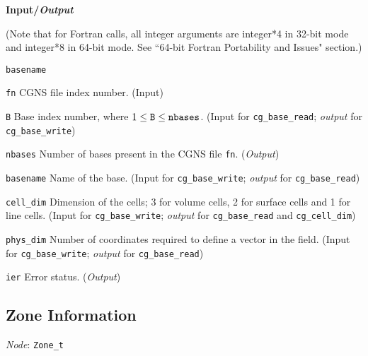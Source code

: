 \noindent
\textbf{\textcolor{input}{Input}/\textcolor{output}{\textit{Output}}}

\noindent (Note that for Fortran calls, all integer arguments are integer*4 in 32-bit mode and integer*8 in 64-bit mode.
See ``64-bit Fortran Portability and Issues" section.)

\begin{Ventryi}{\texttt{basename}}\raggedright
\item [\texttt{fn}]
      CGNS file index number.
      (\textcolor{input}{Input})
\item [\texttt{B}]
      Base index number, where $1 \leq \text{\texttt{B}} \leq \text{\texttt{nbases}}$.
      (\textcolor{input}{Input} for \texttt{cg\_base\_read};
      \textcolor{output}{\textit{output}} for \texttt{cg\_base\_write})
\item [\texttt{nbases}]
      Number of bases present in the CGNS file \texttt{fn}.
      (\textcolor{output}{\textit{Output}})
\item [\texttt{basename}]
      Name of the base.
      (\textcolor{input}{Input} for \texttt{cg\_base\_write};
      \textcolor{output}{\textit{output}} for \texttt{cg\_base\_read})
\item [\texttt{cell\_dim}]
      Dimension of the cells; 3 for volume cells, 2 for surface cells
      and 1 for line cells.
      (\textcolor{input}{Input} for \texttt{cg\_base\_write};
      \textcolor{output}{\textit{output}} for \texttt{cg\_base\_read}
      and \texttt{cg\_cell\_dim})
\item [\texttt{phys\_dim}]
      Number of coordinates required to define a vector in the field.
      (\textcolor{input}{Input} for \texttt{cg\_base\_write};
      \textcolor{output}{\textit{output}} for \texttt{cg\_base\_read})
\item [\texttt{ier}]
      Error status.
      (\textcolor{output}{\textit{Output}})
\end{Ventryi}

\newpage
\subsection{Zone Information}
\label{s:zone}

\noindent
\textit{Node}: \texttt{Zone\_t}


